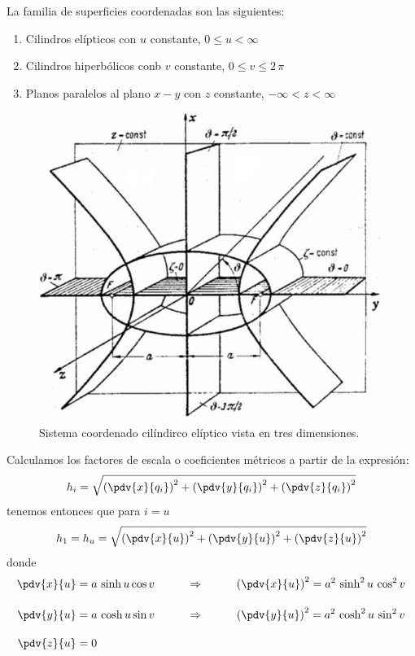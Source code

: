 La familia de superficies coordenadas son las siguientes:
\begin{enumerate}
\item Cilindros elípticos con $u$ constante, $0 \leq u < \infty$
\item Cilindros hiperbólicos conb $v$ constante, $0 \leq v \leq 2 \, \pi$
\item Planos paralelos al plano $x-y$ con $z$ constante, $-\infty < z < \infty$
\end{enumerate}
\begin{figure}[H]
    \centering
    \includegraphics[scale=0.5]{Imagenes/Elliptic-cylindrical-coordinates_02.png}
    \caption{Sistema coordenado cilíndirco elíptico vista en tres dimensiones.}
    \label{fig:figura_coordenada_cilindricas_elipticas_3D}
\end{figure}
Calculamos los factores de escala o coeficientes métricos a partir de la expresión:
\begin{align*}
h_{i} = \sqrt{ \left( \pdv{x}{q_{i}} \right)^{2} + \left( \pdv{y}{q_{i}} \right)^{2} + \left( \pdv{z}{q_{i}} \right)^{2}}
\end{align*}
tenemos entonces que para $ i = u$
\begin{align*}
h_{1} = h_{u} = \sqrt{ \left( \pdv{x}{u} \right)^{2} + \left( \pdv{y}{u} \right)^{2} + \left( \pdv{z}{u} \right)^{2}}
\end{align*}
donde
\begin{align*}
\pdv{x}{u} &= a \, \sinh u \cos v \hspace{1cm} \Rightarrow \hspace{1cm} \left( \pdv{x}{u} \right)^{2} = a^{2} \, \sinh^{2} u \, \cos^{2} v \\[1em]
\pdv{y}{u} &= a \, \cosh u \sin v \hspace{1cm} \Rightarrow \hspace{1cm} \left( \pdv{y}{u} \right)^{2} = a^{2} \, \cosh^{2} u \, \sin^{2} v \\[1em]
\pdv{z}{u} &= 0
\end{align*}
